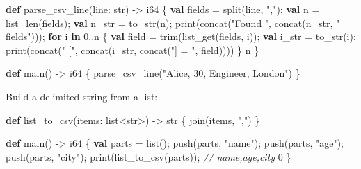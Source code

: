 \documentclass[
  english,
]{book}
\newenvironment{Shaded}{\begin{snugshade}}{\end{snugshade}}
\newcommand{\CommentTok}[1]{\textcolor[rgb]{0.42,0.60,0.33}{\textit{#1}}}
\newcommand{\ControlFlowTok}[1]{\textcolor[rgb]{0.77,0.53,0.75}{\textbf{#1}}}
\newcommand{\DataTypeTok}[1]{\textcolor[rgb]{0.31,0.79,0.69}{#1}}
\newcommand{\DecValTok}[1]{\textcolor[rgb]{0.71,0.81,0.66}{#1}}
\newcommand{\FunctionTok}[1]{\textcolor[rgb]{0.86,0.86,0.67}{#1}}
\newcommand{\KeywordTok}[1]{\textcolor[rgb]{0.34,0.61,0.84}{\textbf{#1}}}
\newcommand{\NormalTok}[1]{\textcolor[rgb]{0.83,0.83,0.83}{#1}}
\newcommand{\OperatorTok}[1]{\textcolor[rgb]{0.83,0.83,0.83}{#1}}
\newcommand{\StringTok}[1]{\textcolor[rgb]{0.81,0.57,0.47}{#1}}
\begin{document}
\begin{Shaded}
\begin{Highlighting}[]
\KeywordTok{def}\NormalTok{ parse\_csv\_line(line: }\DataTypeTok{str}\NormalTok{) }\OperatorTok{{-}\textgreater{}} \DataTypeTok{i64}\NormalTok{ \{}
    \KeywordTok{val}\NormalTok{ fields }\OperatorTok{=} \FunctionTok{split}\NormalTok{(line, }\StringTok{","}\NormalTok{);}
    \KeywordTok{val}\NormalTok{ n }\OperatorTok{=} \FunctionTok{list\_len}\NormalTok{(fields);}
    \KeywordTok{val}\NormalTok{ n\_str }\OperatorTok{=} \FunctionTok{to\_str}\NormalTok{(n);}
    \FunctionTok{print}\NormalTok{(}\FunctionTok{concat}\NormalTok{(}\StringTok{"Found "}\NormalTok{, }\FunctionTok{concat}\NormalTok{(n\_str, }\StringTok{" fields"}\NormalTok{)));}
    \ControlFlowTok{for}\NormalTok{ i }\ControlFlowTok{in} \DecValTok{0}\OperatorTok{..}\NormalTok{n \{}
        \KeywordTok{val}\NormalTok{ field }\OperatorTok{=} \FunctionTok{trim}\NormalTok{(}\FunctionTok{list\_get}\NormalTok{(fields, i));}
        \KeywordTok{val}\NormalTok{ i\_str }\OperatorTok{=} \FunctionTok{to\_str}\NormalTok{(i);}
        \FunctionTok{print}\NormalTok{(}\FunctionTok{concat}\NormalTok{(}\StringTok{"  ["}\NormalTok{, }\FunctionTok{concat}\NormalTok{(i\_str, }\FunctionTok{concat}\NormalTok{(}\StringTok{"] = "}\NormalTok{, field))))}
\NormalTok{    \}}
\NormalTok{    n}
\NormalTok{\}}

\KeywordTok{def}\NormalTok{ main() }\OperatorTok{{-}\textgreater{}} \DataTypeTok{i64}\NormalTok{ \{}
\NormalTok{    parse\_csv\_line(}\StringTok{"Alice, 30, Engineer, London"}\NormalTok{)}
\NormalTok{\}}
\end{Highlighting}
\end{Shaded}

Build a delimited string from a list:

\begin{Shaded}
\begin{Highlighting}[]
\KeywordTok{def}\NormalTok{ list\_to\_csv(items: }\DataTypeTok{list}\OperatorTok{\textless{}}\DataTypeTok{str}\OperatorTok{\textgreater{}}\NormalTok{) }\OperatorTok{{-}\textgreater{}} \DataTypeTok{str}\NormalTok{ \{}
    \FunctionTok{join}\NormalTok{(items, }\StringTok{","}\NormalTok{)}
\NormalTok{\}}

\KeywordTok{def}\NormalTok{ main() }\OperatorTok{{-}\textgreater{}} \DataTypeTok{i64}\NormalTok{ \{}
    \KeywordTok{val}\NormalTok{ parts }\OperatorTok{=} \DataTypeTok{list}\NormalTok{();}
    \FunctionTok{push}\NormalTok{(parts, }\StringTok{"name"}\NormalTok{);}
    \FunctionTok{push}\NormalTok{(parts, }\StringTok{"age"}\NormalTok{);}
    \FunctionTok{push}\NormalTok{(parts, }\StringTok{"city"}\NormalTok{);}
    \FunctionTok{print}\NormalTok{(list\_to\_csv(parts));   }\CommentTok{// name,age,city}
    \DecValTok{0}
\NormalTok{\}}
\end{Highlighting}
\end{Shaded}
\end{document}
